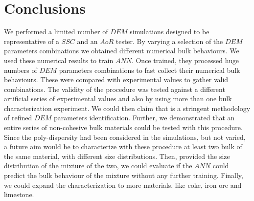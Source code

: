 \section{Conclusions}
\label{sec:conclusions}
We performed a 
limited number of $DEM$ simulations designed to be representative of a $SSC$ and an $AoR$ tester. 
By varying a selection of the $DEM$ parameters combinations we obtained different numerical bulk behaviours. 
We used these numerical results to train $ANN$. Once trained, they processed huge 
numbers of $DEM$ parameters combinations to fast collect their numerical bulk behaviours. 
These were compared with experimental values to gather valid combinations. 
The validity of the procedure was tested against a different artificial series of experimental 
values and also by using more than one bulk characterization experiment. 
We could then claim that is a stringent methodology of refined $DEM$ parameters
identification.
Further, we demonstrated that an entire series of non-cohesive bulk materials could be tested with this procedure.
Since the poly-dispersity had been considered in the simulations, but not varied, a future aim would 
be to characterize with these procedure at least two bulk of the same material, with different size distributions. 
Then, provided the size distribution of the mixture of the two, we could evaluate if the $ANN$ could predict 
the bulk behaviour of the mixture without any further training. 
Finally, we could expand the characterization to more materials, like coke, iron
ore and limestone.

